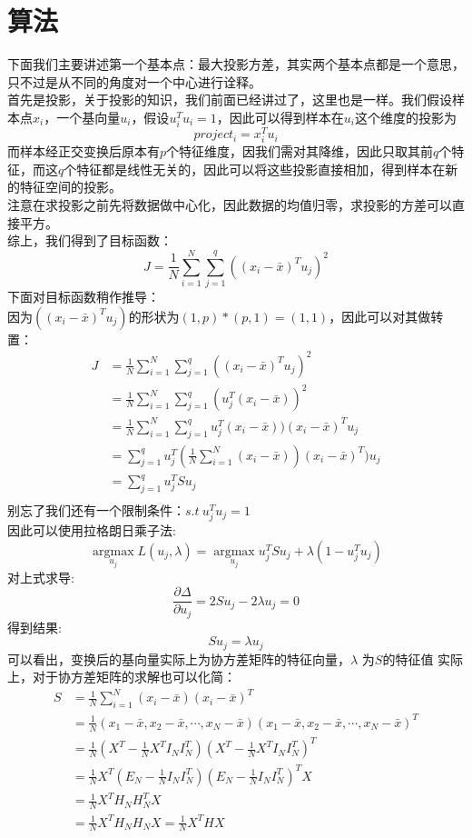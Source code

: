 \documentclass{report}
\begin{document}
\section{算法}
下面我们主要讲述第一个基本点：最大投影方差，其实两个基本点都是一个意思，只不过是从不同的角度对一个中心进行诠释。\\
首先是投影，关于投影的知识，我们前面已经讲过了，这里也是一样。我们假设样本点$x_i$，一个基向量$u_i$，假设$u_i^Tu_i=1$，因此可以得到样本在$u_i$这个维度的投影为
$$
project_i=x_i^Tu_i
$$
而样本经正交变换后原本有$p$个特征维度，因我们需对其降维，因此只取其前$q$个特征，而这$q$个特征都是线性无关的，因此可以将这些投影直接相加，得到样本在新的特征空间的投影。\\
注意在求投影之前先将数据做中心化，因此数据的均值归零，求投影的方差可以直接平方。\\
综上，我们得到了目标函数：
$$
J=\frac{1}{N} \sum_{i=1}^{N} \sum_{j=1}^{q}\left(\left(x_{i}-\bar{x}\right)^{T} u_{j}\right)^{2}
$$
下面对目标函数稍作推导：\\
因为$((x_i-\bar{x})^Tu_j)$的形状为$(1,p)* (p,1)=(1,1)$，因此可以对其做转置：
$$
\begin{aligned}
J&=\frac{1}{N} \sum_{i=1}^{N} \sum_{j=1}^{q}\left(\left(x_{i}-\bar{x}\right)^{T} u_{j}\right)^{2}\\
&=\frac{1}{N} \sum_{i=1}^{N} \sum_{j=1}^{q}(u_{j}^T(x_{i}-\bar{x}))^{2}\\
&=\frac{1}{N} \sum_{i=1}^{N} \sum_{j=1}^{q}u_{j}^T(x_{i}-\bar{x}))(x_{i}-\bar{x})^T u_j\\
&=\sum_{j=1}^{q} u_{j}^T(\frac{1}{N} \sum_{i=1}^{N} (x_{i}-\bar{x}))(x_{i}-\bar{x})^T) u_j\\
&=\sum_{j=1}^q u_j^T S u_j\\
\end{aligned}
$$
别忘了我们还有一个限制条件：$s.t\ u_j^T u_j=1$\\
因此可以使用拉格朗日乘子法:
$$
\underset{u_{j}}{\operatorname{argmax}} L\left(u_{j}, \lambda\right)=\underset{u_{j}}{\operatorname{argmax}} u_{j}^{T} S u_{j}+\lambda\left(1-u_{j}^{T} u_{j}\right)
$$
对上式求导:
$$
\frac{\partial \Delta}{\partial u_j}=2S u_j -2\lambda u_j=0
$$
得到结果:
$$
S u_j = \lambda u_j
$$
可以看出，变换后的基向量实际上为协方差矩阵的特征向量，$\lambda$ 为$S$的特征值
实际上，对于协方差矩阵的求解也可以化简：
$$
\begin{aligned}
S &=\frac{1}{N} \sum_{i=1}^{N}\left(x_{i}-\bar{x}\right)\left(x_{i}-\bar{x}\right)^{T} \\
&=\frac{1}{N}\left(x_{1}-\bar{x}, x_{2}-\bar{x}, \cdots, x_{N}-\bar{x}\right)\left(x_{1}-\bar{x}, x_{2}-\bar{x}, \cdots, x_{N}-\bar{x}\right)^{T} \\
&=\frac{1}{N}\left(X^{T}-\frac{1}{N} X^{T} I_{N} I_{N}^{T}\right)\left(X^{T}-\frac{1}{N} X^{T} I_{N} I_{N}^{T}\right)^{T} \\
&=\frac{1}{N} X^{T}\left(E_{N}-\frac{1}{N} I_{N} I_{N}^T\right)\left(E_{N}-\frac{1}{N} I_{N} I_{N}^T\right)^{T} X \\
&=\frac{1}{N} X^{T} H_{N} H_{N}^{T} X \\
&=\frac{1}{N} X^{T} H_{N} H_{N} X=\frac{1}{N} X^{T} H X
\end{aligned}
$$
\end{document}
